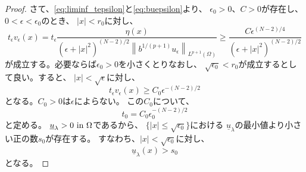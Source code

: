 \begin{proof}
さて、\eqref{eq:liminf_tepsilon}と\eqref{eq:buepsilon}より、
$\epsilon_0 > 0$、$C > 0$が存在し、$0 <\epsilon < \epsilon_0$のとき、
$\lvert x \rvert < r_0$に対し、
\begin{equation}
 t_\epsilon v_\epsilon (x) = t_\epsilon \frac{\eta(x)}{(\epsilon +
 \lvert x \rvert^2)^{(N-2)/2} \left\| b^{1/(p+1)} u_\epsilon
 \right\|_{L^{p+1}(\Omega)}} \geq \frac{C
 \epsilon^{(N-2)/4}}{(\epsilon + \lvert x \rvert^2)^{(N-2)/2}} 
 \label{eq:teve_p}
\end{equation}
が成立する。必要ならば$\epsilon_0 > 0$を小さくとりなおし、
$\sqrt{\epsilon_0} < r_0$が成立するとして良い。すると、
$\lvert x \lvert < \sqrt{\epsilon}$に対し、
\begin{equation}
 t_\epsilon v_\epsilon (x) \geq C_0 \epsilon^{-(N-2)/2} \label{eq:teve}
\end{equation}
となる。$C_0 > 0$は$\epsilon$によらない。
この$C_0$について、
\begin{equation}
 t_0 = C_0 \epsilon_0^{-(N-2)/2} \label{eq:t_0_epsilon}
\end{equation}
と定める。
$\underline{u}_\lambda > 0 ~\text{in}~ \Omega$であるから、
$\{ \lvert x \rvert \leq \sqrt{\epsilon_0} \}$における
$\underline{u}_\lambda$の最小値より小さい正の数$s_0$が存在する。
すなわち、$\lvert x \rvert < \sqrt{\epsilon_0}$に対し、
\begin{equation}
 \underline{u}_\lambda (x) > s_0 \label{eq:uus_0}
\end{equation}
となる。


\end{proof}
